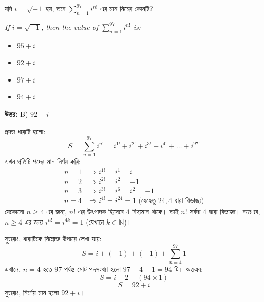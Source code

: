 \documentclass[12pt, a4paper]{article}
\begin{document}
\begin{tcolorbox}[questionbox={প্রশ্ন (Question) 8}]
    \noindent
    যদি $i = \sqrt{-1}$ হয়, তবে $\sum_{n=1}^{97} i^{n!}$ এর মান নিচের কোনটি?
    
    \vspace{0.8em}
    \begin{english}
    \noindent\textit{\color{darkgray}
    If $i = \sqrt{-1}$, then the value of $\sum_{n=1}^{97} i^{n!}$ is:
    }
    \end{english}
\end{tcolorbox}

\begin{itemize}[label={}, leftmargin=1cm, itemsep=0.5em]
    \item[\textbf{A)}] $95 + i$
    \item[\textbf{B)}] $92 + i$
    \item[\textbf{C)}] $97 + i$
    \item[\textbf{D)}] $94 + i$
\end{itemize}

\vspace{0.5em}
\begin{tcolorbox}[answerbox]
    \textbf{\color{success} উত্তর:} B) $92 + i$
\end{tcolorbox}
\vspace{1em}

\begin{tcolorbox}[solutionbox={সমাধান (Solution)}]
    \noindent
    প্রদত্ত ধারাটি হলো:
    \[ S = \sum_{n=1}^{97} i^{n!} = i^{1!} + i^{2!} + i^{3!} + i^{4!} + \dots + i^{97!} \]
    এখন প্রতিটি পদের মান নির্ণয় করি:
    \begin{align*}
        n = 1 &\Rightarrow i^{1!} = i^1 = i \\
        n = 2 &\Rightarrow i^{2!} = i^2 = -1 \\
        n = 3 &\Rightarrow i^{3!} = i^6 = i^2 = -1 \\
        n = 4 &\Rightarrow i^{4!} = i^{24} = 1 \text{ (যেহেতু } 24, 4 \text{ দ্বারা বিভাজ্য)}
    \end{align*}
    যেকোনো $n \geq 4$ এর জন্য, $n!$ এর উৎপাদক হিসেবে $4$ বিদ্যমান থাকে। তাই $n!$ সর্বদা $4$ দ্বারা বিভাজ্য। অতএব, $n \geq 4$ এর জন্য $i^{n!} = i^{4k} = 1$ (যেখানে $k \in \mathbb{N}$)।
    
    \vspace{0.5em}
    সুতরাং, ধারাটিকে নিম্নোক্ত উপায়ে লেখা যায়:
    \[ S = i + (-1) + (-1) + \sum_{n=4}^{97} 1 \]
    এখানে, $n = 4$ হতে $97$ পর্যন্ত মোট পদসংখ্যা হলো $97 - 4 + 1 = 94$ টি। অতএব:
    \[ S = i - 2 + (94 \times 1) \]
    \[ S = 92 + i \]
    সুতরাং, নির্ণেয় মান হলো $92 + i$।
\end{tcolorbox}
\vspace{1em}
\end{document}
